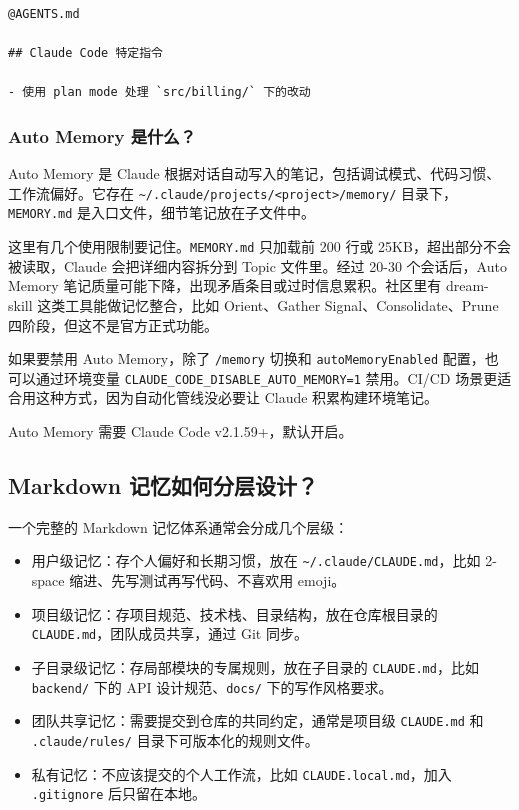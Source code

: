 \documentclass[10pt,a4paper]{ctexart}
\begin{document}
\begin{lstlisting}
@AGENTS.md

## Claude Code 特定指令

- 使用 plan mode 处理 `src/billing/` 下的改动
\end{lstlisting}



\subsubsection{Auto Memory 是什么？}


Auto Memory 是 Claude 根据对话自动写入的笔记，包括调试模式、代码习惯、工作流偏好。它存在 \texttt{\textasciitilde{}/.claude/projects/<project>/memory/} 目录下，\texttt{MEMORY.md} 是入口文件，细节笔记放在子文件中。



这里有几个使用限制要记住。\texttt{MEMORY.md} 只加载前 200 行或 25KB，超出部分不会被读取，Claude 会把详细内容拆分到 Topic 文件里。经过 20-30 个会话后，Auto Memory 笔记质量可能下降，出现矛盾条目或过时信息累积。社区里有 dream-skill 这类工具能做记忆整合，比如 Orient、Gather Signal、Consolidate、Prune 四阶段，但这不是官方正式功能。



如果要禁用 Auto Memory，除了 \texttt{/memory} 切换和 \texttt{autoMemoryEnabled} 配置，也可以通过环境变量 \texttt{CLAUDE\_CODE\_DISABLE\_AUTO\_MEMORY=1} 禁用。CI/CD 场景更适合用这种方式，因为自动化管线没必要让 Claude 积累构建环境笔记。



Auto Memory 需要 Claude Code v2.1.59+，默认开启。



\subsection{Markdown 记忆如何分层设计？}


一个完整的 Markdown 记忆体系通常会分成几个层级：


\begin{itemize}[itemsep=2pt, topsep=4pt]
  \item 用户级记忆：存个人偏好和长期习惯，放在 \texttt{\textasciitilde{}/.claude/CLAUDE.md}，比如 2-space 缩进、先写测试再写代码、不喜欢用 emoji。
  \item 项目级记忆：存项目规范、技术栈、目录结构，放在仓库根目录的 \texttt{CLAUDE.md}，团队成员共享，通过 Git 同步。
  \item 子目录级记忆：存局部模块的专属规则，放在子目录的 \texttt{CLAUDE.md}，比如 \texttt{backend/} 下的 API 设计规范、\texttt{docs/} 下的写作风格要求。
  \item 团队共享记忆：需要提交到仓库的共同约定，通常是项目级 \texttt{CLAUDE.md} 和 \texttt{.claude/rules/} 目录下可版本化的规则文件。
  \item 私有记忆：不应该提交的个人工作流，比如 \texttt{CLAUDE.local.md}，加入 \texttt{.gitignore} 后只留在本地。
\end{itemize}
\end{document}
